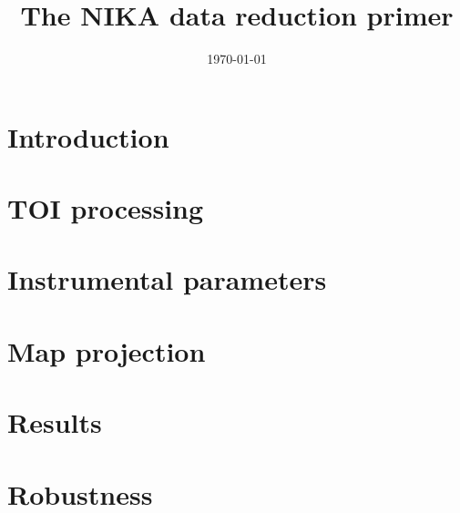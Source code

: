 \documentclass[twocolumn,traditabstract]{aa}
\begin{document}
\title{The NIKA data reduction primer}
%
\date{\today}

\maketitle

\tableofcontents
\newpage

\section{Introduction}
\label{sec:introduction}


%

\section{TOI processing}
\label{sec:toi_proc}


\section{Instrumental parameters}
\label{se:instr_params}


\section{Map projection}
\label{sec:map_maker}


\section{Results}
\label{sec:results}


\section{Robustness}
\label{sec:robust}

\end{document}
